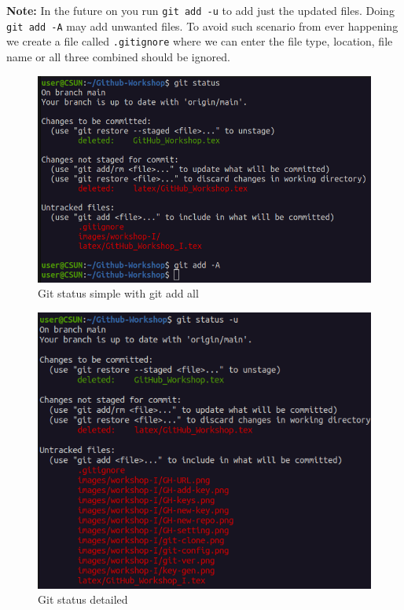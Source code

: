 \documentclass[12pt, a4paper]{article}
\begin{document}
\textbf{Note:} In the future on you run \texttt{git add -u} to add just the updated files. Doing \texttt{git add -A} may add unwanted files. To avoid such scenario from ever happening we create a file called \verb+.gitignore+ where we can enter the file type, location, file name or all three combined should be ignored.
\begin{figure}[H]
\centering
\includegraphics[scale=0.5]{../images/workshop-I/git-add.png}
\caption{Git status simple with git add all}
\end{figure}
\begin{figure}[H]
\centering
\includegraphics[scale=0.5]{../images/workshop-I/git-status-u.png}
\caption{Git status detailed}
\end{figure}
\end{document}
